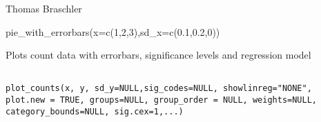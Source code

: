 \documentclass[a4paper]{book}
\begin{document}
%
\begin{Author}\relax
Thomas Braschler
\end{Author}
%
\begin{Examples}
\begin{ExampleCode}
pie_with_errorbars(x=c(1,2,3),sd_x=c(0.1,0.2,0))

\end{ExampleCode}
\end{Examples}
%
\begin{Description}\relax
Plots count data with errorbars, significance levels and regression model
\end{Description}
%
\begin{Usage}
\begin{verbatim}
	             
plot_counts(x, y, sd_y=NULL,sig_codes=NULL, showlinreg="NONE", plot.new = TRUE, groups=NULL, group_order = NULL, weights=NULL, category_bounds=NULL, sig.cex=1,...)
\end{verbatim}
\end{Usage}
%
\end{document}
